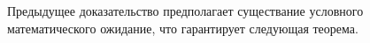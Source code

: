 \begin{comment}
От $y$ зависит лишь совместная плотность, а интеграл от неё по всей оси $y$
является плотностью распределения $\xi$.
То есть интеграл по $y$ уходит,
а вместо $\pdf{x,y}$ появляется $r\left( x \right)$.
Также учтём индикатор и сузим область интегрирования с $\mathbb{R}$ до $\Delta$
$$\integral{\mathbb{R}}{}{y}{ \integral{\mathbb{R}}{}{x}{
  \varphi^{\eta}\left( x \right) \cdot \indicator{x \in \Delta}
      \cdot \pdf{x,y}}}
  = \integral{\Delta}{}{x}{
      \varphi^{\eta}\left( x \right) \cdot r\left( x \right)}$$

Дальше распишем функцию $\varphi^{\eta}$,
пользуясь формулой \eqref{phiIntegral}
$$\integral{\Delta}{}{x}{
  \varphi^{\eta}\left( x \right) \cdot r\left( x \right)}
  = \integral{\Delta}{}{x}{\left(
      \frac{\integral{\mathbb{R}}{}{y}{y \cdot \pdf{x,y}}}
      {r\left( x \right)}
      \cdot r\left( x \right) \right)}$$

Сократим одинаковые плотности и получим интересный двойной интеграл
$$\integral{\Delta}{}{x}{\left(
      \frac{\integral{\mathbb{R}}{}{y}{y \cdot \pdf{x,y}}}
      {r\left( x \right)}
      \cdot r\left( x \right) \right)}
  = \integral{\Delta}{}{x}{
      \integral{\mathbb{R}}{}{y}{y \cdot \pdf{x,y}}}$$

Вернём индикатор обратно в интеграл
$$\integral{\Delta}{}{x}{
  \integral{\mathbb{R}}{}{y}{y \cdot \pdf{x,y} \cdot}}
  = \integral{\mathbb{R}}{}{x}{
      \integral{\mathbb{R}}{}{y}{y \cdot \indicator{x \in \Delta}
      \cdot \pdf{x,y}}}$$

Видим, что это и есть то математическое ожидание, которое нам нужно
$$\integral{\mathbb{R}}{}{x}{
  \integral{\mathbb{R}}{}{y}{y \cdot \indicator{x \in \Delta}
      \cdot \pdf{x,y}}}
  = \Mean{ \eta \cdot \indicatorof{\xi \in \Delta} }
  = \Mean{ \eta \cdot \indicatorof{A} }$$

Это значит, что тождество доказано и условное математическое ожидание
для случайных величин с совместной плотностью считается с помощью
$$\varphi^{\eta}\left( x \right)
  = \frac{\integral{\mathbb{R}}{}{y}{y \cdot \pdf{x,y}}}
      {\integral{\mathbb{R}}{}{y}{\pdf{x,y}}}$$

По формуле
$$\Mean{ \eta \mcond \xi }
  = \varphi^{\eta}\left( \xi \right)
  = \left. \varphi^{\eta}\left( x \right) \right|_{x= \xi}$$
\end{proof}
\end{comment}

\begin{remark}
  Предыдущее доказательство предполагает существание условного математического
  ожидание, что гарантирует следующая теорема.
\end{remark}

